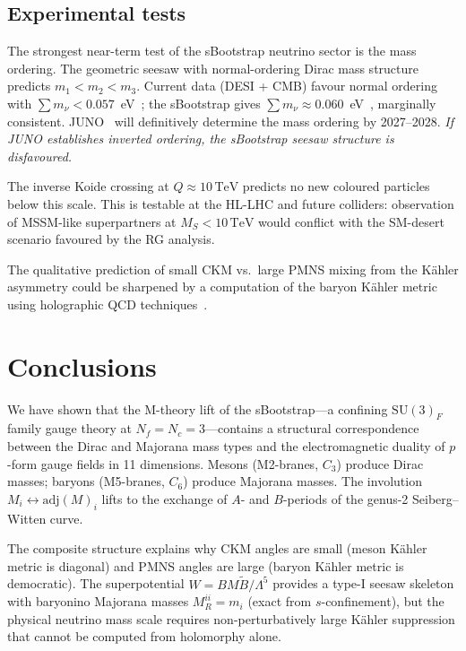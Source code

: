 \documentclass[aps,prd,twocolumn,showpacs,preprintnumbers,superscriptaddress,floatfix]{revtex4-2}
\newcommand{\SU}{\mathrm{SU}}
\newcommand{\Nf}{N_{\!f}}
\newcommand{\Nc}{N_{\!c}}
\newcommand{\adj}{\mathrm{adj}}
\newcommand{\TeV}{\,\mathrm{TeV}}
\begin{document}
\subsection{Experimental tests}

The strongest near-term test of the sBootstrap neutrino sector
is the mass ordering.
The geometric seesaw with normal-ordering Dirac mass structure
predicts $m_1 < m_2 < m_3$.
Current data (DESI + CMB) favour normal ordering with
$\sum m_\nu < 0.057$~eV~\cite{PDG:2024}; the
sBootstrap gives $\sum m_\nu \approx 0.060$~eV~\cite{Rivero:2024epjc},
marginally consistent.
JUNO~\cite{JUNO:2022} will definitively determine the mass
ordering by 2027--2028.
\emph{If JUNO establishes inverted ordering, the sBootstrap
seesaw structure is disfavoured.}

The inverse Koide crossing at $Q \approx 10\TeV$ predicts no new
coloured particles below this scale.
This is testable at the HL-LHC and future colliders: observation
of MSSM-like superpartners at $M_S < 10\TeV$ would conflict with
the SM-desert scenario favoured by the RG analysis.

The qualitative prediction of small CKM vs.\ large PMNS mixing
from the K\"ahler asymmetry could be sharpened by a computation
of the baryon K\"ahler metric using holographic QCD
techniques~\cite{SakaiSugimoto:2005}.


\section{Conclusions}
\label{sec:conclusions}

We have shown that the M-theory lift of the sBootstrap---a
confining $\SU(3)_F$ family gauge theory at
$\Nf = \Nc = 3$---contains a structural correspondence between
the Dirac and Majorana mass types and the electromagnetic duality
of $p$-form gauge fields in 11 dimensions.
Mesons (M2-branes, $C_3$) produce Dirac masses; baryons (M5-branes,
$C_6$) produce Majorana masses.
The involution $M_i \leftrightarrow \adj(M)_i$ lifts to the
exchange of $A$- and $B$-periods of the genus-2 Seiberg--Witten
curve.

The composite structure explains why CKM angles are small (meson
K\"ahler metric is diagonal) and PMNS angles are large (baryon
K\"ahler metric is democratic).
The superpotential $W = BM\tilde{B}/\Lambda^5$ provides a type-I
seesaw skeleton with baryonino Majorana masses
$M_R^{ii} = m_i$ (exact from $s$-confinement), but the physical
neutrino mass scale requires non-perturbatively large K\"ahler
suppression that cannot be computed from holomorphy alone.
\end{document}
